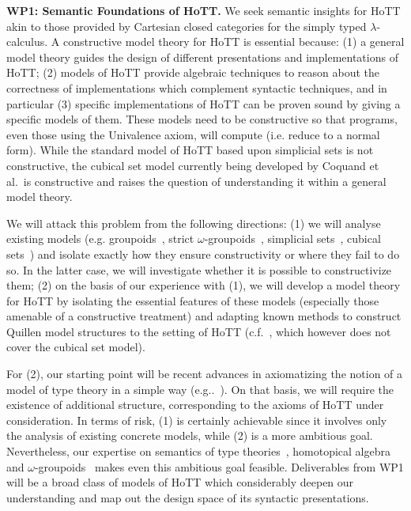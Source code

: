 \documentclass[a4paper,11pt]{article}
\begin{document}
{\bf WP1: Semantic Foundations of HoTT.}  We seek semantic insights
for HoTT akin to those provided by Cartesian closed categories for
the simply typed $\lambda$-calculus.  A constructive model theory for
HoTT is essential because: (1) a general model theory 
guides the design of different presentations and implementations of
HoTT; (2) models of HoTT provide algebraic techniques to reason
about the correctness of implementations which complement syntactic
techniques, and in particular (3) specific implementations of HoTT can
be proven sound by giving a specific models of them.  These models
need to be constructive so that programs, even those using the
Univalence axiom, will compute ({i.e.} reduce to a normal form). While
the standard model of HoTT based upon simplicial sets is not
constructive, the cubical set model currently being developed by Coquand et
{al.}\ is constructive and raises the question of understanding it
within a general model theory.

 We will attack this problem from the following directions: (1) we
 will analyse existing models ({e.g.} groupoids~\cite{HofmannM:groitt}, strict
 $\omega$-groupoids~\cite{WarrenM:strgit}, simplicial sets~\cite{KapulkinC:simmuv}, cubical sets~\cite{BezemM:cubsmt}) and isolate
 exactly how they ensure constructivity or where they fail to do
 so. In the latter case, we will investigate whether it is possible to
 constructivize them; (2) on the basis of our experience with (1), we
 will develop a model theory for HoTT by isolating the essential
 features of these models (especially those amenable of a constructive treatment)
 and  adapting known methods to construct Quillen model structures
 to the setting of HoTT ({c.f.}~\cite{ShulmanM:uniidh}, which however does not cover the cubical set model).

For (2), our starting point will be recent advances in axiomatizing the
notion of a model of type theory in a simple way ({e.g..}~\cite{AwodeyS:natmtt}). On that basis, we will require the existence of additional
structure, corresponding to the axioms of HoTT under consideration. In
terms of risk, (1) is certainly achievable since it involves only the
analysis of existing concrete models, while (2) is a more ambitious
goal. Nevertheless, our expertise on semantics of type
theories~\cite{neil2014relParamDep}, homotopical
algebra~\cite{GambinoN:homl2c,GambinoN:weilsh} and
$\omega$-groupoids~\cite{alti:csl12} makes even this ambitious goal
feasible. Deliverables from WP1 will be a broad class of models of
HoTT which considerably deepen our understanding and map out the
design space of its syntactic presentations.
\end{document}
